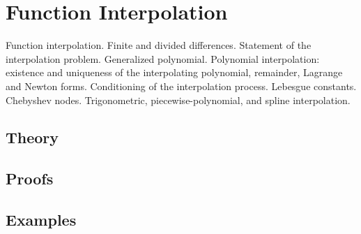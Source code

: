 
\section{Function Interpolation}
\label{sec:2.1.09-interpolation}

\begin{ticket}
Function interpolation. Finite and divided differences. Statement of the interpolation problem. Generalized polynomial. Polynomial interpolation: existence and uniqueness of the interpolating polynomial, remainder, Lagrange and Newton forms. Conditioning of the interpolation process. Lebesgue constants. Chebyshev nodes. Trigonometric, piecewise-polynomial, and spline interpolation.
\end{ticket}

\subsection*{Theory}

\subsection*{Proofs}

\subsection*{Examples}
